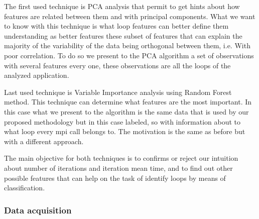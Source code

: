The first used technique is PCA analysis that permit to get hints 
about how features are related between them and with principal components. What
we want to know with this technique is what loop features can better define
them understanding as better features these subset of features that can explain
the majority of the variability of the data being orthogonal between them, i.e.
With poor correlation. To do so we present to the PCA algorithm a set of
observations with several features every one, these observations are all the loops
of the analyzed application. 

Last used technique is 
Variable Importance analysis using Random Forest method. This technique can
determine what features are the most important. In this case what we
present to the algorithm is the same data that is used by our proposed
methodology but in this case labeled, so with information about to what loop
every mpi call belongs to. The motivation is the same as before but with a 
different approach.

The main objective for both techniques is to confirms or reject our intuition about 
number of iterations and iteration mean time, and to find out other possible features that
can help on the task of identify loops by means of classification.
  

\subsubsection{Data acquisition}

